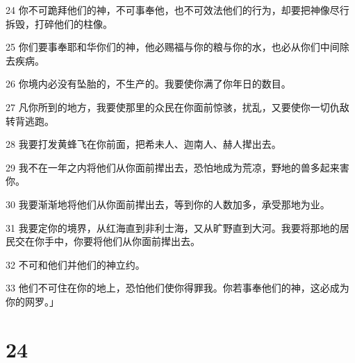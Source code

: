 \par 24 你不可跪拜他们的神，不可事奉他，也不可效法他们的行为，却要把神像尽行拆毁，打碎他们的柱像。
\par 25 你们要事奉耶和华你们的神，他必赐福与你的粮与你的水，也必从你们中间除去疾病。
\par 26 你境内必没有坠胎的，不生产的。我要使你满了你年日的数目。
\par 27 凡你所到的地方，我要使那里的众民在你面前惊骇，扰乱，又要使你一切仇敌转背逃跑。
\par 28 我要打发黄蜂飞在你前面，把希未人、迦南人、赫人撵出去。
\par 29 我不在一年之内将他们从你面前撵出去，恐怕地成为荒凉，野地的兽多起来害你。
\par 30 我要渐渐地将他们从你面前撵出去，等到你的人数加多，承受那地为业。
\par 31 我要定你的境界，从红海直到非利士海，又从旷野直到大河。我要将那地的居民交在你手中，你要将他们从你面前撵出去。
\par 32 不可和他们并他们的神立约。
\par 33 他们不可住在你的地上，恐怕他们使你得罪我。你若事奉他们的神，这必成为你的网罗。」

\chapter{24}

